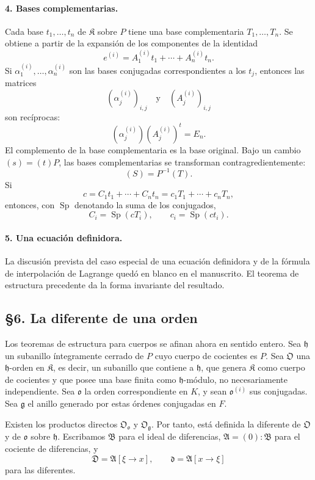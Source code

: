 \paragraph{4. Bases complementarias.}
Cada base $t_1,\ldots,t_n$ de $\mathfrak K$ sobre $P$ tiene una base complementaria $T_1,\ldots,T_n$. Se obtiene a partir de la expansión de los componentes de la identidad
\[
        e^{(i)}=A_1^{(i)}t_1+
        \cdots+A_n^{(i)}t_n.
\]
Si $\alpha_1^{(i)},\ldots,\alpha_n^{(i)}$ son las bases conjugadas correspondientes a los $t_j$, entonces las matrices
\[
        (\alpha_j^{(i)})_{i,j}
        \quad\text{y}\quad
        (A_j^{(i)})_{i,j}
\]
son recíprocas:
\[
        (\alpha_j^{(i)})(A_j^{(i)})^{t}=E_n.
\]
El complemento de la base complementaria es la base original. Bajo un cambio $(s)=(t)P$, las bases complementarias se transforman contragredientemente:
\[
        (S)=P^{-1}(T).
\]
Si
\[
        c=C_1t_1+
        \cdots+C_nt_n
        =c_1T_1+
        \cdots+c_nT_n,
\]
entonces, con $\operatorname{Sp}$ denotando la suma de los conjugados,
\[
        C_i=\operatorname{Sp}(cT_i),
        \qquad
        c_i=\operatorname{Sp}(ct_i).
\]

\paragraph{5. Una ecuación definidora.}
La discusión prevista del caso especial de una ecuación definidora y de la fórmula de interpolación de Lagrange quedó en blanco en el manuscrito. El teorema de estructura precedente da la forma invariante del resultado.

\subsection*{§6. La diferente de una orden}

Los teoremas de estructura para cuerpos se afinan ahora en sentido entero. Sea $\mathfrak h$ un subanillo íntegramente cerrado de $P$ cuyo cuerpo de cocientes es $P$. Sea $\mathfrak O$ una $\mathfrak h$-orden en $\mathfrak K$, es decir, un subanillo que contiene a $\mathfrak h$, que genera $\mathfrak K$ como cuerpo de cocientes y que posee una base finita como $\mathfrak h$-módulo, no necesariamente independiente. Sea $\mathfrak o$ la orden correspondiente en $K$, y sean $\mathfrak o^{(i)}$ sus conjugadas. Sea $\mathfrak g$ el anillo generado por estas órdenes conjugadas en $F$.

Existen los productos directos $\mathfrak O_{\mathfrak o}$ y $\mathfrak O_{\mathfrak g}$. Por tanto, está definida la diferente de $\mathfrak O$ y de $\mathfrak o$ sobre $\mathfrak h$. Escribamos $\mathfrak B$ para el ideal de diferencias, $\mathfrak A=(0):\mathfrak B$ para el cociente de diferencias, y
\[
        \mathfrak D=\mathfrak A[\xi\to x],
        \qquad
        \mathfrak d=\mathfrak A[x\to\xi]
\]
para las diferentes.

